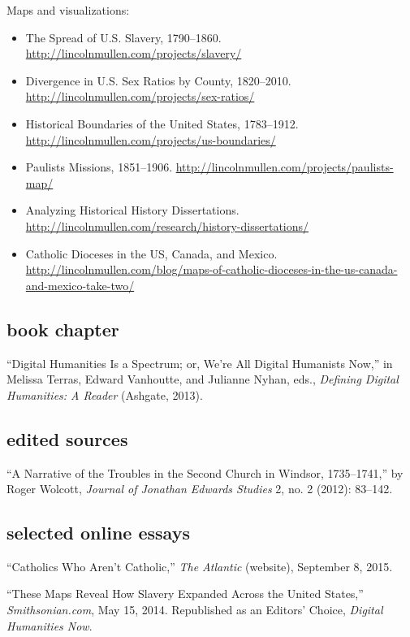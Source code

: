 \documentclass[11pt]{article}
\begin{document}
Maps and visualizations:

\begin{itemize}
\item The Spread of U.S.  Slavery, 1790--1860. 
  \url{http://lincolnmullen.com/projects/slavery/}
\item Divergence in U.S. Sex Ratios by County, 1820--2010. 
  \url{http://lincolnmullen.com/projects/sex-ratios/}
\item Historical Boundaries of the United States, 1783--1912.
  \url{http://lincolnmullen.com/projects/us-boundaries/}
\item Paulists Missions, 1851--1906. 
  \url{http://lincolnmullen.com/projects/paulists-map/}
\item Analyzing Historical History Dissertations. 
  \url{http://lincolnmullen.com/research/history-dissertations/}
\item Catholic Dioceses in the US, Canada, and Mexico. 
  \url{http://lincolnmullen.com/blog/maps-of-catholic-dioceses-in-the-us-canada-and-mexico-take-two/}
\end{itemize}

\subsection{book chapter}\label{book-chapter}

``Digital Humanities Is a Spectrum; or, We're All Digital Humanists
Now,'' in Melissa Terras, Edward Vanhoutte, and Julianne Nyhan, eds.,
\emph{Defining Digital Humanities: A Reader} (Ashgate, 2013).

\subsection{edited sources}\label{edited-sources}

``A Narrative of the Troubles in the Second Church in Windsor,
1735--1741,'' by Roger Wolcott, \emph{Journal of Jonathan Edwards
Studies} 2, no. 2 (2012): 83--142.

\subsection{selected online essays}\label{selected-online-essays}

``Catholics Who Aren't Catholic,'' \emph{The Atlantic} (website), September 8, 
2015.

``These Maps Reveal How Slavery Expanded Across the United States,''
\emph{Smithsonian.com}, May 15, 2014. Republished as an Editors' Choice,
\emph{Digital Humanities Now}.
\end{document}
